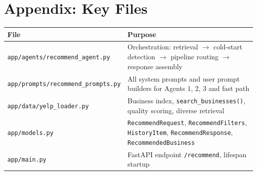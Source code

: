 \documentclass[11pt]{article}
\begin{document}
\section*{Appendix: Key Files}

\begin{table}[h]
\centering
\begin{tabularx}{\textwidth}{lX}
\toprule
\textbf{File} & \textbf{Purpose} \\
\midrule
\texttt{app/agents/recommend\_agent.py} & Orchestration: retrieval $\rightarrow$ cold-start detection $\rightarrow$ pipeline routing $\rightarrow$ response assembly \\
\texttt{app/prompts/recommend\_prompts.py} & All system prompts and user prompt builders for Agents 1, 2, 3 and fast path \\
\texttt{app/data/yelp\_loader.py} & Business index, \texttt{search\_businesses()}, quality scoring, diverse retrieval \\
\texttt{app/models.py} & \texttt{RecommendRequest}, \texttt{RecommendFilters}, \texttt{HistoryItem}, \texttt{RecommendResponse}, \texttt{RecommendedBusiness} \\
\texttt{app/main.py} & FastAPI endpoint \texttt{/recommend}, lifespan startup \\
\bottomrule
\end{tabularx}
\end{table}
\end{document}
